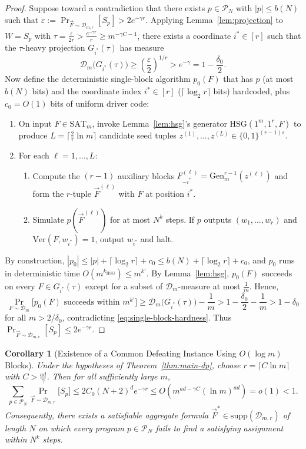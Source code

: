 \documentclass[11pt]{article}
\newtheorem{corollary}[theorem]{Corollary}
\begin{document}
\begin{proof}
Suppose toward a contradiction that there exists $p \in \mathcal{P}_N$ with $|p| \le b(N)$ such that $\varepsilon := \Pr_{\vec{F} \sim \mathcal{D}_{m,r}}[S_p] > 2 e^{-\gamma r}$.
Applying Lemma~\ref{lem:projection} to $W = S_p$ with $\tau = \frac{\varepsilon}{2r} > \frac{e^{-\gamma r}}{r} \ge m^{-\gamma C - 1}$, there exists a coordinate $i^* \in [r]$ such that the $\tau$-heavy projection $G_{i^*}(\tau)$ has measure
\[
  \mathcal{D}_m\big(G_{i^*}(\tau)\big) \ge \left(\frac{\varepsilon}{2}\right)^{1/r} > e^{-\gamma} = 1 - \frac{\delta_0}{2}.
\]
Now define the deterministic single-block algorithm $p_0(F)$ that has $p$ (at most $b(N)$ bits) and the coordinate index $i^* \in [r]$ ($\lceil \log_2 r \rceil$ bits) hardcoded, plus $c_0 = O(1)$ bits of uniform driver code:
\begin{enumerate}
  \item On input $F \in \mathrm{SAT}_m$, invoke Lemma~\ref{lem:hsg}'s generator $\mathrm{HSG}(1^m, 1^r, F)$ to produce $L = \lceil \frac{2}{\tau}\ln m \rceil$ candidate seed tuples $z^{(1)},\dots,z^{(L)} \in \{0,1\}^{(r-1)s}$.
  \item For each $\ell = 1,\dots,L$:
    \begin{enumerate}
      \item Compute the $(r-1)$ auxiliary blocks $F_{-i^*}^{(\ell)} = \mathrm{Gen}_m^{r-1}(z^{(\ell)})$ and form the $r$-tuple $\vec{F}^{(\ell)}$ with $F$ at position $i^*$.
      \item Simulate $p(\vec{F}^{(\ell)})$ for at most $N^k$ steps. If $p$ outputs $(w_1,\dots,w_r)$ and $\mathrm{Ver}(F, w_{i^*}) = 1$, output $w_{i^*}$ and halt.
    \end{enumerate}
\end{enumerate}
By construction, $|p_0| \le |p| + \lceil \log_2 r \rceil + c_0 \le b(N) + \lceil \log_2 r \rceil + c_0$, and $p_0$ runs in deterministic time $O(m^{k_{\mathrm{HSG}}}) \le m^{k'}$.
By Lemma~\ref{lem:hsg}, $p_0(F)$ succeeds on every $F \in G_{i^*}(\tau)$ except for a subset of $\mathcal{D}_m$-measure at most $\frac{1}{m}$. Hence,
\[
  \Pr_{F \sim \mathcal{D}_m}\big[ p_0(F) \text{ succeeds within } m^{k'} \big]
  \ge \mathcal{D}_m\big(G_{i^*}(\tau)\big) - \frac{1}{m}
  > 1 - \frac{\delta_0}{2} - \frac{1}{m} > 1 - \delta_0
\]
for all $m > 2/\delta_0$, contradicting \eqref{eq:single-block-hardness}. Thus $\Pr_{\vec{F} \sim \mathcal{D}_{m,r}}[S_p] \le 2 e^{-\gamma r}$.
\end{proof}

\begin{corollary}[Existence of a Common Defeating Instance Using $O(\log m)$ Blocks]\label{cor:cascade}
Under the hypotheses of Theorem~\ref{thm:main-dp}, choose $r = \lceil C \ln m \rceil$ with $C > \frac{ad}{\gamma}$. Then for all sufficiently large $m$,
\[
  \sum_{p \in \mathcal{P}_N} \Pr_{\vec{F} \sim \mathcal{D}_{m,r}}\big[ S_p \big]
  \le 2 C_0 (N+2)^d e^{-\gamma r}
  \le O\!\left( m^{ad - \gamma C} (\ln m)^{ad} \right) = o(1) < 1.
\]
Consequently, there exists a satisfiable aggregate formula $\vec{F}^* \in \mathrm{supp}(\mathcal{D}_{m,r})$ of length $N$ on which every program $p \in \mathcal{P}_N$ fails to find a satisfying assignment within $N^k$ steps.
\end{corollary}
\end{document}
